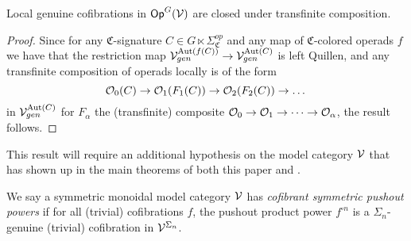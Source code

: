 \documentclass[a4paper,10pt
,draft
]{article}%
\renewcommand{\1}{\eta}%
\newcommand{\SC}{\Sigma_{\mathfrak C}}
\begin{document}
\begin{lemma}
      \label{TRANSCOMP_LGC_LEM}
      Local genuine cofibrations in $\mathsf{Op}^G(\mathcal V)$ are closed under transfinite composition.
\end{lemma}

\begin{proof}
      Since for any $\mathfrak C$-signature $C \in G \ltimes \SC^{op}$ and any map of $\mathfrak C$-colored operads $f$ we have that
      the restriction map
      $\mathcal V^{\operatorname{Aut}(f(C))}_{gen} \to \mathcal V^{\operatorname{Aut}(C)}_{gen}$
      is left Quillen,
      and any transfinite composition of operads locally is of the form
      \begin{equation}
            \mathcal{O}_0(C) \to \mathcal{O}_1(F_1(C)) \to \mathcal{O}_2(F_2(C)) \to \dots   
      \end{equation}
      in $\mathcal V^{\operatorname{Aut}(C)}_{gen}$
      for $F_\alpha$ the (transfinite) composite $\mathcal{O}_0 \to \mathcal{O}_1 \to \dots \to \mathcal{O}_\alpha$,
      the result follows.
\end{proof}

This result will require an additional hypothesis on the model category $\mathcal V$
that has shown up in the main theorems of both this paper and \cite{BP_geo}.


\begin{definition}
      \label{CSPP_DEF}
      We say a symmetric monoidal model category $\mathcal V$ has \textit{cofibrant symmetric pushout powers} if
      for all (trivial) cofibrations $f$, the pushout product power $f^{\square n}$
      is a $\Sigma_n$-genuine (trivial) cofibration in $\mathcal V^{\Sigma_n}$. 
\end{definition}
\end{document}
